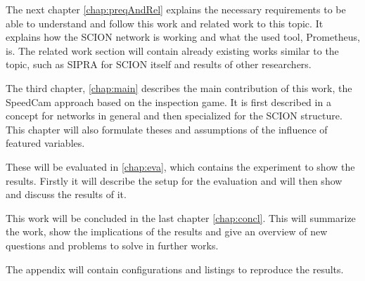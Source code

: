 \documentclass[thesis.tex]{subfiles}
\begin{document}
The next chapter \autoref{chap:preqAndRel} explains the necessary requirements to be able to understand and follow this work and related work to this topic. It explains how the SCION network is working and what the used tool, Prometheus, is. The related work section will contain already existing works similar to the topic, such as SIPRA for SCION itself and results of other researchers. 

The third chapter, \autoref{chap:main} describes the main contribution of this work, the SpeedCam approach based on the inspection game. It is first described in a concept for networks in general and then specialized for the SCION structure. This chapter will also formulate theses and assumptions of the influence of featured variables.

These will be evaluated in \autoref{chap:eva}, which contains the experiment to show the results. Firstly it will describe the setup for the evaluation and will then show and discuss the results of it.

This work will be concluded in the last chapter \autoref{chap:concl}. This will summarize the work, show the implications of the results and give an overview of new questions and problems to solve in further works.

The appendix will contain configurations and listings to reproduce the results.

\subfilebib %
\end{document}
